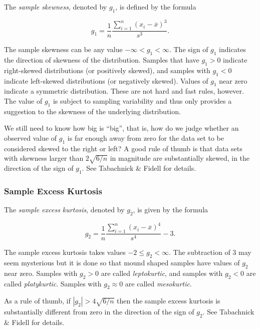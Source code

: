 \documentclass[]{book}
\numberwithin{equation}{chapter}
\numberwithin{figure}{chapter}
\theoremstyle{plain}
\theoremstyle{definition}
\theoremstyle{remark}
\theoremstyle{definition}
\theoremstyle{definition}
\theoremstyle{remark}
\begin{document}
The \emph{sample skewness}, denoted by \(g_{1}\), is defined by the
formula

\begin{equation}
g_{1}=\frac{1}{n}\frac{\sum_{i=1}^{n}(x_{i}-\overline{x})^{3}}{s^{3}}.
\end{equation}

The sample skewness can be any value \(-\infty<g_{1}<\infty\). The sign
of \(g_{1}\) indicates the direction of skewness of the distribution.
Samples that have \(g_{1}>0\) indicate right-skewed distributions (or
positively skewed), and samples with \(g_{1}<0\) indicate left-skewed
distributions (or negatively skewed). Values of \(g_{1}\) near zero
indicate a symmetric distribution. These are not hard and fast rules,
however. The value of \(g_{1}\) is subject to sampling variability and
thus only provides a suggestion to the skewness of the underlying
distribution.

We still need to know how big is ``big'', that is, how do we judge
whether an observed value of \(g_{1}\) is far enough away from zero for
the data set to be considered skewed to the right or left? A good rule
of thumb is that data sets with skewness larger than \(2\sqrt{6/n}\) in
magnitude are substantially skewed, in the direction of the sign of
\(g_{1}\). See Tabachnick \& Fidell \autocite{Tabachnick2006} for
details.

\subsubsection{Sample Excess Kurtosis}\label{sample-excess-kurtosis}

The \emph{sample excess kurtosis}, denoted by \(g_{2}\), is given by the
formula

\begin{equation}
g_{2}=\frac{1}{n}\frac{\sum_{i=1}^{n}(x_{i}-\overline{x})^{4}}{s^{4}}-3.
\end{equation}

The sample excess kurtosis takes values \(-2\leq g_{2}<\infty\). The
subtraction of 3 may seem mysterious but it is done so that mound shaped
samples have values of \(g_{2}\) near zero. Samples with \(g_{2}>0\) are
called \emph{leptokurtic}, and samples with \(g_{2}<0\) are called
\emph{platykurtic}. Samples with \(g_{2}\approx0\) are called
\emph{mesokurtic}.

As a rule of thumb, if \(|g_{2}|>4\sqrt{6/n}\) then the sample excess
kurtosis is substantially different from zero in the direction of the
sign of \(g_{2}\). See Tabachnick \& Fidell \autocite{Tabachnick2006}
for details.
\end{document}
